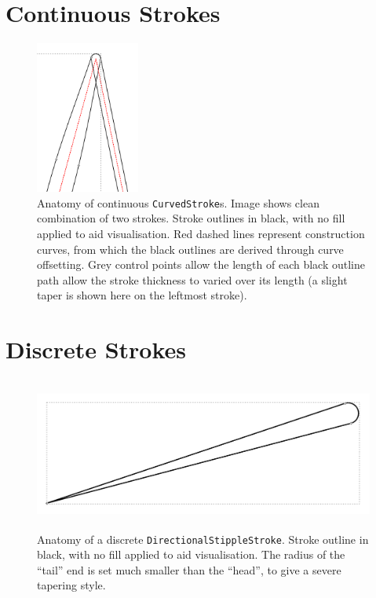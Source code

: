 \newpage
\FloatBarrier
\section{Continuous Strokes}\label{appendix_continous_strokes}

\begin{figure}[h!]
	\centering
	\includegraphics[height=5cm]{images/stroke_construction.png}
	\caption{Anatomy of continuous \texttt{CurvedStroke}s. Image shows clean combination of two strokes. Stroke outlines in black, with no fill applied to aid visualisation. Red dashed lines represent construction curves, from which the black outlines are derived through curve offsetting. Grey control points allow the length of each black outline path allow the stroke thickness to varied over its length (a slight taper is shown here on the leftmost stroke).}\label{stroke_construction}
\end{figure}

\FloatBarrier
\section{Discrete Strokes}\label{appendix_discrete_strokes}

\begin{figure}[h!]
	\centering
	\includegraphics[height=5cm]{images/stipple_construction.png}
	\caption{Anatomy of a discrete \texttt{DirectionalStippleStroke}. Stroke outline in black, with no fill applied to aid visualisation. The radius of the ``tail'' end is set much smaller than the ``head'', to give a severe tapering style.}\label{stroke_construction}
\end{figure}